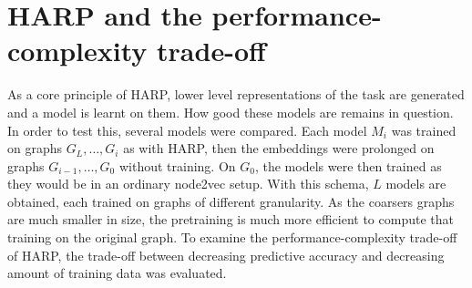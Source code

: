 \section{HARP and the performance-complexity trade-off}\label{sec:performance-vs-complexity}


As a core principle of HARP, lower level representations of the task are generated and a model is learnt on them. How good these models are remains in question. In order to test this, several models were compared. Each model \( M_i \) was trained on graphs \( G_L, \dots, G_i \) as with HARP, then the embeddings were prolonged on graphs \( G_{i-1}, \dots, G_0 \) without training. On \( G_0 \), the models were then trained as they would be in an ordinary node2vec setup. With this schema, \( L \) models are obtained, each trained on graphs of different granularity. As the coarsers graphs are much smaller in size, the pretraining is much more efficient to compute that training on the original graph. To examine the performance-complexity trade-off of HARP, the trade-off between decreasing predictive accuracy and decreasing amount of training data was evaluated.
